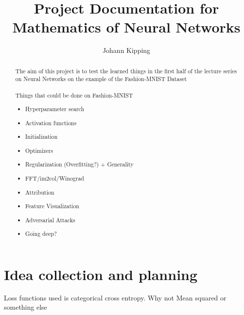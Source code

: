 \documentclass[]{article}
\title{Project Documentation for \\Mathematics of Neural Networks}
\author{Johann Kipping}
\begin{document}
\maketitle

\begin{abstract}
The aim of this project is to test the learned things in the first half of the lecture series on Neural Networks on the example of the Fashion-MNIST Dataset\\
\\
Things that could be done on Fashion-MNIST
\begin{itemize}
	\item Hyperparameter search
	\item Activation functions
	\item Initialization
	\item Optimizers
	\item Regularization (Overfitting?) + Generality
	\item FFT/im2col/Winograd
	\item Attribution
	\item Feature Visualization
	\item Adversarial Attacks
	\item Going deep?
\end{itemize}
\end{abstract}

\section{Idea collection and planning}
Loss functions used is categorical cross entropy. Why not Mean squared or something else
\end{document}
